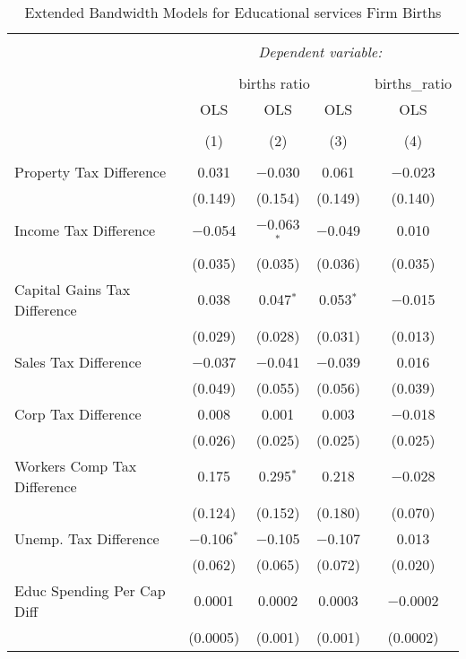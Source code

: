 
\begin{table}[!htbp] \centering 
  \caption{Extended Bandwidth Models for  Educational services Firm Births} 
  \label{61eb} 
\begin{tabular}{@{\extracolsep{5pt}}lcccc} 
\\[-1.8ex]\hline 
\hline \\[-1.8ex] 
 & \multicolumn{4}{c}{\textit{Dependent variable:}} \\ 
\cline{2-5} 
\\[-1.8ex] & \multicolumn{3}{c}{births ratio} & births\_ratio \\ 
 & OLS & OLS & OLS & OLS \\ 
\\[-1.8ex] & (1) & (2) & (3) & (4)\\ 
\hline \\[-1.8ex] 
 Property Tax Difference & 0.031 & $-$0.030 & 0.061 & $-$0.023 \\ 
  & (0.149) & (0.154) & (0.149) & (0.140) \\ 
  Income Tax Difference & $-$0.054 & $-$0.063$^{*}$ & $-$0.049 & 0.010 \\ 
  & (0.035) & (0.035) & (0.036) & (0.035) \\ 
  Capital Gains Tax Difference & 0.038 & 0.047$^{*}$ & 0.053$^{*}$ & $-$0.015 \\ 
  & (0.029) & (0.028) & (0.031) & (0.013) \\ 
  Sales Tax Difference & $-$0.037 & $-$0.041 & $-$0.039 & 0.016 \\ 
  & (0.049) & (0.055) & (0.056) & (0.039) \\ 
  Corp Tax Difference & 0.008 & 0.001 & 0.003 & $-$0.018 \\ 
  & (0.026) & (0.025) & (0.025) & (0.025) \\ 
  Workers Comp Tax Difference & 0.175 & 0.295$^{*}$ & 0.218 & $-$0.028 \\ 
  & (0.124) & (0.152) & (0.180) & (0.070) \\ 
  Unemp. Tax Difference & $-$0.106$^{*}$ & $-$0.105 & $-$0.107 & 0.013 \\ 
  & (0.062) & (0.065) & (0.072) & (0.020) \\ 
  Educ Spending Per Cap Diff & 0.0001 & 0.0002 & 0.0003 & $-$0.0002 \\ 
  & (0.0005) & (0.001) & (0.001) & (0.0002) \\ 

\end{tabular}
\end{table}
